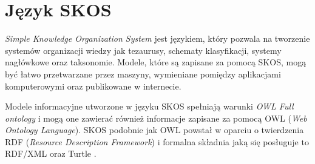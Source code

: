 \documentclass[12pt,a4paper,notitlepage]{article}
\begin{document}
\section{Język SKOS}
\emph{Simple Knowledge Organization System} jest językiem, który pozwala na
tworzenie systemów organizacji wiedzy jak tezaurusy, schematy klasyfikacji,
systemy nagłówkowe oraz taksonomie. Modele, które są zapisane za pomocą SKOS,
mogą być łatwo przetwarzane przez maszyny, wymieniane pomiędzy aplikacjami
komputerowymi oraz publikowane w internecie.

Modele informacyjne utworzone w języku SKOS spełniają warunki 
\emph{OWL Full ontology} i mogą one zawierać również informacje zapisane za
pomocą OWL (\emph{Web Ontology Language}). SKOS podobnie jak OWL powstał w
oparciu o twierdzenia RDF (\emph{Resource Description Framework}) i formalna 
składnia jaką się posługuje to RDF/XML oraz Turtle \cite{SKOS-ref}. 
\end{document}
